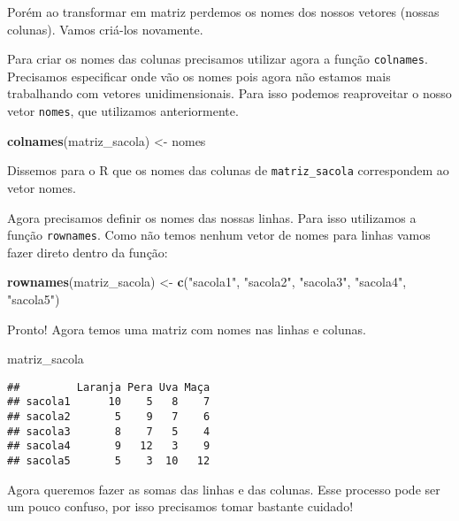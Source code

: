 \documentclass[]{book}
\newenvironment{Shaded}{\begin{snugshade}}{\end{snugshade}}
\newcommand{\KeywordTok}[1]{\textcolor[rgb]{0.13,0.29,0.53}{\textbf{#1}}}
\newcommand{\NormalTok}[1]{#1}
\newcommand{\StringTok}[1]{\textcolor[rgb]{0.31,0.60,0.02}{#1}}
\theoremstyle{definition}
\theoremstyle{definition}
\theoremstyle{definition}
\theoremstyle{remark}
\begin{document}
Porém ao transformar em matriz perdemos os nomes dos nossos vetores (nossas colunas). Vamos criá-los novamente.

Para criar os nomes das colunas precisamos utilizar agora a função \texttt{colnames}. Precisamos especificar onde vão os nomes pois agora não estamos mais trabalhando com vetores unidimensionais. Para isso podemos reaproveitar o nosso vetor \texttt{nomes}, que utilizamos anteriormente.

\begin{Shaded}
\begin{Highlighting}[]
\KeywordTok{colnames}\NormalTok{(matriz_sacola) <-}\StringTok{ }\NormalTok{nomes}
\end{Highlighting}
\end{Shaded}

Dissemos para o R que os nomes das colunas de \texttt{matriz\_sacola} correspondem ao vetor nomes.

Agora precisamos definir os nomes das nossas linhas. Para isso utilizamos a função \texttt{rownames}. Como não temos nenhum vetor de nomes para linhas vamos fazer direto dentro da função:

\begin{Shaded}
\begin{Highlighting}[]
\KeywordTok{rownames}\NormalTok{(matriz_sacola) <-}\StringTok{ }\KeywordTok{c}\NormalTok{(}\StringTok{"sacola1"}\NormalTok{, }\StringTok{"sacola2"}\NormalTok{, }\StringTok{"sacola3"}\NormalTok{, }\StringTok{"sacola4"}\NormalTok{, }\StringTok{"sacola5"}\NormalTok{)}
\end{Highlighting}
\end{Shaded}

Pronto! Agora temos uma matriz com nomes nas linhas e colunas.

\begin{Shaded}
\begin{Highlighting}[]
\NormalTok{matriz_sacola}
\end{Highlighting}
\end{Shaded}

\begin{verbatim}
##         Laranja Pera Uva Maça
## sacola1      10    5   8    7
## sacola2       5    9   7    6
## sacola3       8    7   5    4
## sacola4       9   12   3    9
## sacola5       5    3  10   12
\end{verbatim}

Agora queremos fazer as somas das linhas e das colunas. Esse processo pode ser um pouco confuso, por isso precisamos tomar bastante cuidado!
\end{document}
